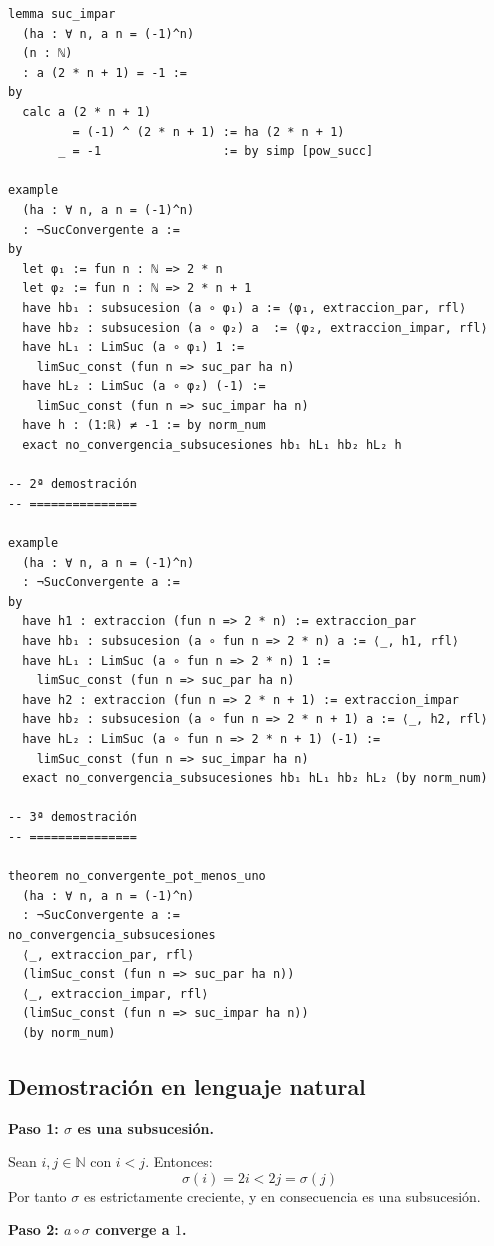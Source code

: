 \begin{verbatim}
lemma suc_impar
  (ha : ∀ n, a n = (-1)^n)
  (n : ℕ)
  : a (2 * n + 1) = -1 :=
by
  calc a (2 * n + 1)
         = (-1) ^ (2 * n + 1) := ha (2 * n + 1)
       _ = -1                 := by simp [pow_succ]

example
  (ha : ∀ n, a n = (-1)^n)
  : ¬SucConvergente a :=
by
  let φ₁ := fun n : ℕ => 2 * n
  let φ₂ := fun n : ℕ => 2 * n + 1
  have hb₁ : subsucesion (a ∘ φ₁) a := ⟨φ₁, extraccion_par, rfl⟩
  have hb₂ : subsucesion (a ∘ φ₂) a  := ⟨φ₂, extraccion_impar, rfl⟩
  have hL₁ : LimSuc (a ∘ φ₁) 1 :=
    limSuc_const (fun n => suc_par ha n)
  have hL₂ : LimSuc (a ∘ φ₂) (-1) :=
    limSuc_const (fun n => suc_impar ha n)
  have h : (1:ℝ) ≠ -1 := by norm_num
  exact no_convergencia_subsucesiones hb₁ hL₁ hb₂ hL₂ h

-- 2ª demostración
-- ===============

example
  (ha : ∀ n, a n = (-1)^n)
  : ¬SucConvergente a :=
by
  have h1 : extraccion (fun n => 2 * n) := extraccion_par
  have hb₁ : subsucesion (a ∘ fun n => 2 * n) a := ⟨_, h1, rfl⟩
  have hL₁ : LimSuc (a ∘ fun n => 2 * n) 1 :=
    limSuc_const (fun n => suc_par ha n)
  have h2 : extraccion (fun n => 2 * n + 1) := extraccion_impar
  have hb₂ : subsucesion (a ∘ fun n => 2 * n + 1) a := ⟨_, h2, rfl⟩
  have hL₂ : LimSuc (a ∘ fun n => 2 * n + 1) (-1) :=
    limSuc_const (fun n => suc_impar ha n)
  exact no_convergencia_subsucesiones hb₁ hL₁ hb₂ hL₂ (by norm_num)

-- 3ª demostración
-- ===============

theorem no_convergente_pot_menos_uno
  (ha : ∀ n, a n = (-1)^n)
  : ¬SucConvergente a :=
no_convergencia_subsucesiones
  ⟨_, extraccion_par, rfl⟩
  (limSuc_const (fun n => suc_par ha n))
  ⟨_, extraccion_impar, rfl⟩
  (limSuc_const (fun n => suc_impar ha n))
  (by norm_num)
\end{verbatim}

\subsection{Demostración en lenguaje natural}

  \textbf{Paso 1: $\sigma$ es una subsucesión.}

  Sean $i,j\in\mathbb{N}$ con $i<j$. Entonces:
  \[
    \sigma(i) = 2i < 2j = \sigma(j)
  \]
  Por tanto $\sigma$ es estrictamente creciente, y en consecuencia es una
  subsucesión.

  \medskip
  \textbf{Paso 2: $a\circ\sigma$ converge a $1$.}

